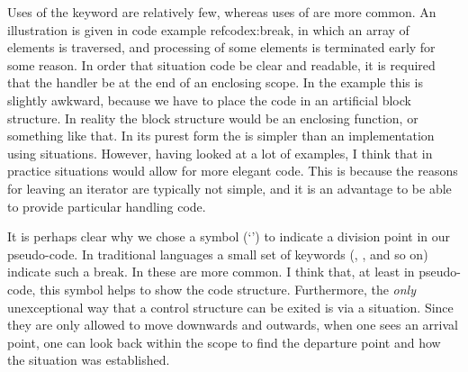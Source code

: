 \documentclass[10pt]{amsart}
\begin{document}


Uses of the \texttt{} keyword are relatively few,
whereas uses of \texttt{} are more common.  An illustration
is given in code example ref{codex:break}, in which an array of
elements is traversed, and processing of some elements is terminated
early for some reason.  In order that situation code be clear and
readable, it is required that the handler be at the end of an
enclosing scope.  In the example this is slightly awkward, because we
have to place the code in an artificial block structure.  In reality
the block structure would be an enclosing function, or something like
that.  In its purest form the \texttt{} is simpler than an
implementation using situations.  However, having looked at a lot of
examples, I think that in practice situations would allow for more
elegant code.  This is because the reasons for leaving an iterator are
typically not simple, and it is an advantage to be able to provide
particular handling code.

It is perhaps clear why we chose a symbol (`\texttt{\cdedent}') to
indicate a division point in our pseudo-code.  In traditional
languages a small set of keywords (\texttt{},
\texttt{}, and so on) indicate such a break.  In \Utop these
are more common.  I think that, at least in pseudo-code, this symbol
helps to show the code structure.  Furthermore, the \emph{only}
unexceptional way that a control structure can be exited is via a
situation.  Since they are only allowed to move downwards and
outwards, when one sees an arrival point, one can look back within the
scope to find the departure point and how the situation was
established.
\end{document}
